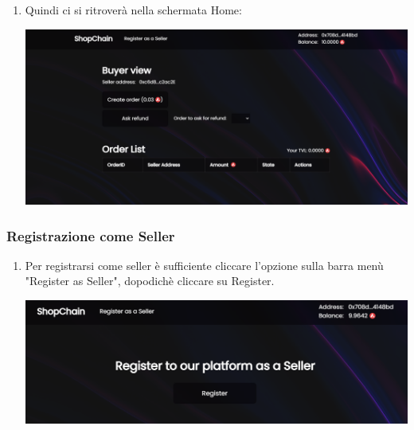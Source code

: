 \begin{enumerate}
\item Quindi ci si ritroverà nella schermata Home:\\

\begin{center}
\includegraphics[scale = 0.35]{img/home.PNG}
\end{center}

\end{enumerate}
\subsubsection{Registrazione come Seller}

\begin{enumerate}
    \item Per registrarsi come seller è sufficiente cliccare l’opzione sulla barra menù "Register as Seller", dopodichè cliccare su Register.
    
    \begin{center}
        \includegraphics[scale = 0.4]{img/RegisterSeller.PNG}
    \end{center}
\end{enumerate}

